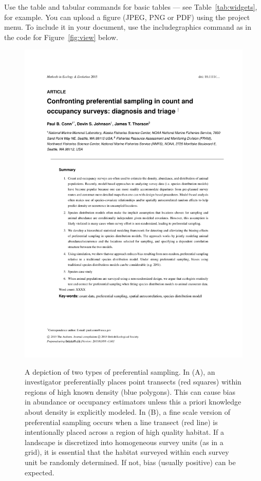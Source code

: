 \documentclass[fleqn,10pt]{wlpeerj}
\begin{document}
Use the table and tabular commands for basic tables --- see Table~\ref{tab:widgets}, for example. You can upload a figure (JPEG, PNG or PDF) using the project menu. To include it in your document, use the includegraphics command as in the code for Figure~\ref{fig:view} below.

\begin{figure}[ht]
\centering
\caption{A depiction of two types of preferential sampling.  In (A), an investigator preferentially places point transects (red squares) within regions of high known density (blue polygons).  This can cause bias in abundance or occupancy estimators unless this a priori knowledge about density is explicitly modeled.  In (B), a fine scale version of preferential sampling occurs when a line transect (red line) is intentionally placed across a region of high quality habitat.  If a landscape is discretized into homogeneous survey units (as in a grid), it is essential that the habitat surveyed within each survey unit be randomly determined.  If not, bias (usually positive) can be expected.}
\includegraphics[width=\linewidth]{Pref_sampling}
\label{fig:pref}
\end{figure}
\end{document}
